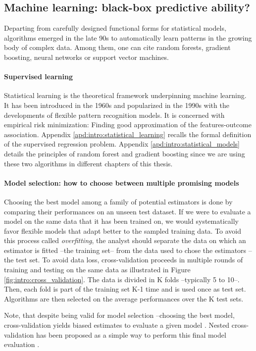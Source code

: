 \documentclass[french,12pt,twoside,a4paper]{book}
\begin{document}
\begin{background_box_left}

  \subsection{Machine learning: black-box predictive ability?}\label{subsec:intro:machine_learning}

  Departing from carefully designed functional forms for statistical models,
  algorithms emerged in the late 90s to automatically learn patterns in the
  growing body of complex data. Among them, one can cite random forests,
  gradient boosting, neural networks or support vector machines.

  \paragraph{Supervised learning}

  Statistical learning \citep{vapnik1999nature} is the theoretical framework
  underpinning machine learning. It has been introduced in the 1960s and
  popularized in the 1990s with the developments of flexible pattern recognition
  models. It is concerned with empirical risk minimization: Finding good
  approximation of the features-outcome association. Appendix
  \ref{apd:intro:statistical_learning} recalls the formal definition of the
  supervised regression problem. Appendix \ref{apd:intro:statistical_models}
  details the principles of random forest and gradient boosting since we are
  using these two algorithms in different chapters of this thesis.

  \paragraph{Model selection: how to choose between multiple promising models}

  Choosing the best model among a family of potential estimators is done by
  comparing their performances on an unseen test dataset. If we were to evaluate
  a model on the same data that it has been trained on, we would systematically
  favor flexible models that adapt better to the sampled training data. To avoid
  this process called \emph{overfitting}, the analyst should separate the data
  on which an estimator is fitted --the training set-- from the data used to
  chose the estimators --the test set. To avoid data loss, cross-validation
  \citep{stone1974cross} proceeds in multiple rounds of training and testing on
  the same data as illustrated in Figure \ref{fig:intro:cross_validation}. The
  data is divided in K folds --typically 5 to 10--. Then, each fold is part of
  the training set K-1 time and is used once as test set. Algorithms are then
  selected on the average performances over the K test sets.

  Note, that despite being valid for model selection --choosing the best model,
  cross-validation yields biased estimates to evaluate a given model
  \citep{wager2020cross}. Nested cross-validation has been proposed as a simple
  way to perform this final model evaluation \citep{varoquaux2017assessingq}.

\end{background_box_left}
\end{document}
